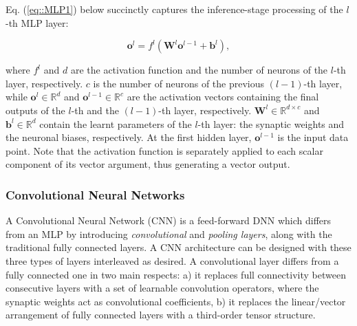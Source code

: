 \documentclass[preprint,review,10pt]{elsarticle}
\begin{document}
	Eq. (\ref{eq::MLP1}) below succinctly captures the inference-stage processing of the $l$-th MLP layer:
	
	\begin{equation}
		\mathbf{o}^l = f^l(\mathbf{W}^l\mathbf{o}^{l-1} + \mathbf{b}^l),
		\label{eq::MLP1}
	\end{equation}
	
	\noindent where $f^l$ and $d$ are the activation function and the number of neurons of the $l$-th layer, respectively. $c$ is the number of neurons of the previous $(l-1)$-th layer, while $\mathbf{o}^l \in \mathbb{R}^{d}$ and $\mathbf{o}^{l-1} \in \mathbb{R}^{c}$ are the activation vectors containing the final outputs of the $l$-th and the $(l-1)$-th layer, respectively. $\mathbf{W}^l \in \mathbb{R}^{d \times c}$ and $\mathbf{b}^l \in \mathbb{R}^{d}$ contain the learnt parameters of the $l$-th layer: the synaptic weights and the neuronal biases, respectively. At the first hidden layer, $\mathbf{o}^{l-1}$ is the input data point. Note that the activation function is separately applied to each scalar component of its vector argument, thus generating a vector output.
	
	\subsubsection{Convolutional Neural Networks}
	A Convolutional Neural Network (CNN) \cite{lenet}\cite{alexnet} is a feed-forward DNN which differs from an MLP by introducing \textit{convolutional} and \textit{pooling layers}, along with the traditional fully connected layers. A CNN architecture can be designed with these three types of layers interleaved as desired. A convolutional layer differs from a fully connected one in two main respects: a) it replaces full connectivity between consecutive layers with a set of learnable convolution operators, where the synaptic weights act as convolutional coefficients, b) it replaces the linear/vector arrangement of fully connected layers with a third-order tensor structure.
	
\end{document}
